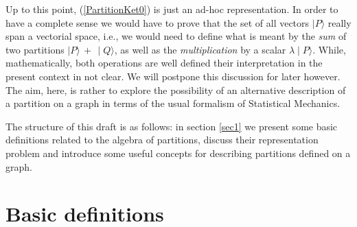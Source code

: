 \documentclass[twocolumn,aps,sort,nofootinbib]{revtex4}
\begin{document}
Up to this point, (\ref{PartitionKet0}) is just an ad-hoc representation. 
In order to have a complete sense we would have
to prove that the set of all vectors $\mid P\rangle$ really span a vectorial space, i.e.,
we would need to define what is meant by the {\sl sum} of two partitions 
$\mid P\rangle\,+\,\mid Q\rangle$, as well as the {\sl multiplication} by a scalar 
$\lambda \mid P\rangle$. While, mathematically, both operations are well defined their
interpretation in the present context in not clear. 
We will postpone this discussion for later however. The aim,
here, is rather to explore the possibility of an alternative description of a partition on a graph
in terms of the usual formalism of Statistical Mechanics. 


The structure of this draft is as follows: in section \ref{sec1} we present
some basic definitions related to the algebra of partitions, discuss
their representation problem and introduce some useful concepts for 
describing partitions defined on a graph. 
  
\section{Basic definitions\label{sec1}}
\end{document}
